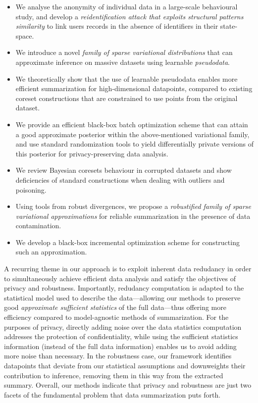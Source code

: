 \begin{itemize}
	\item We analyse the anonymity of individual data in a large-scale behavioural study, and develop a \emph{reidentification attack that exploits structural patterns similarity} to link users records in the absence of identifiers in their state-space.
	\item We introduce a novel \emph{family of sparse variational distributions} that can approximate inference on massive datasets using learnable \emph{pseudodata}.
	\item We theoretically show that the use of learnable pseudodata enables more efficient summarization for high-dimensional datapoints, compared to existing coreset constructions that are constrained to use points from the original dataset.
	\item We provide an efficient black-box batch optimization scheme that can attain a good approximate posterior within the above-mentioned variational family, and use standard randomization tools to yield differentially private versions of this posterior for privacy-preserving data analysis.
	\item We review Bayesian coresets behaviour in corrupted datasets and show deficiencies of standard constructions when dealing with outliers and poisoning.
	\item Using tools from robust divergences, we propose a \emph{robustified family of sparse variational approximations} for reliable summarization in the presence of data contamination.
	\item We develop a black-box incremental optimization scheme for constructing such an approximation.
\end{itemize}

A recurring theme in our approach is to exploit inherent data redudancy in order to simultaneously achieve efficient data analysis and satisfy the objectives of privacy and robustness. Importantly, redudancy computation is adapted to the statistical model used to describe the data---allowing our methods to preserve good \emph{approximate sufficient statistics} of the full data---thus offering more efficiency compared to model-agnostic methods of summarization. For the purposes of privacy, directly adding noise over the data statistics computation addresses the protection of confidentiality, while using the sufficient statistics information (instead of the full data information) enables us to avoid adding more noise than necessary. In the robustness case, our framework identifies datapoints that deviate from our statistical assumptions and downweights their contribution to inference, removing them in this way from the extracted summary. Overall, our methods indicate that privacy and robustness are just two facets of the fundamental problem that data summarization puts forth.


